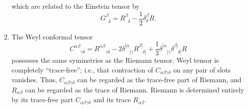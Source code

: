 \begin{enumerate}
which are related to the Einstein tensor by 
\[G^{\beta}_{\phantom{\beta}\delta} =  R^{\beta}_{\phantom{\beta}\delta} - \frac{1}{2} \delta^{\beta}_{\delta}R.\]
\item The Weyl conformal tensor
\[C^{\alpha \beta}_{\phantom{\alpha \beta} \gamma \delta} = R^{\alpha \beta}_{\phantom{\alpha \beta} \gamma \delta} -2 \delta^{[\alpha}_{\phantom{[\alpha}[\gamma} R^{\beta]}_{\phantom{\beta]}\delta]} + \frac{1}{3} \delta^{[\alpha}_{\phantom{[\alpha}[\gamma} \delta^{\beta]}_{\phantom{\beta]}\delta]} R \]
possesses the same symmetries as the Riemann tensor. 
Weyl tensor is completely ``trace-free''; i.e., that
contraction of $C_{\alpha \beta \gamma \delta}$ on any pair of slots vanishes. Thus, $C_{\alpha \beta \gamma \delta}$ can be regarded as the trace-free part of Riemann, and $R_{\alpha \beta}$ can be regarded as the trace of Riemann. Riemann is determined entirely by its trace-free part $C_{\alpha \beta \gamma \delta}$ and
its trace $R_{\alpha \beta}$.
\end{enumerate}

